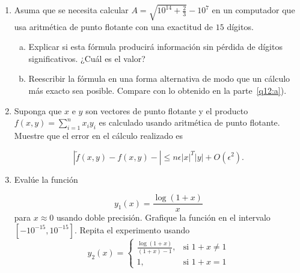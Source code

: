 \begin{frame}
  \begin{enumerate}
    \resume

    \item

          Asuma que se necesita calcular
          \begin{math}
            A=
            \sqrt{
              10^{14}+\frac{2}{3}
            }-
            10^7
          \end{math}
          en un computador que usa aritmética de punto flotante con una
          exactitud de $15$ dígitos.

          \begin{enumerate}[a)]
            \item Explicar si esta fórmula producirá información sin
                  pérdida de dígitos significativos.
                  ¿Cuál es el valor?

            \item\label{q12:a}

                  Reescribir la fórmula en una forma alternativa de
                  modo que un cálculo más exacto sea posible.
                  Compare con lo obtenido en la parte~\ref{q12:a}).
          \end{enumerate}

    \item

          Suponga que $x$ e $y$ son vectores de punto flotante y el
          producto $f\left(x,y\right)=\sum_{i=1}^{n}x_{i}y_{i}$
          es calculado usando aritmética de punto flotante.
          Muestre que el error en el cálculo realizado es

          \begin{equation*}
            \left|
            \widetilde{f}\left(x,y\right)-
            f\left(x,y\right)-
            \right|\leq
            n\epsilon
            {\left|x\right|}^{T}
            \left|y\right|+
            O\left(\epsilon^2\right).
          \end{equation*}


    \item

          Evalúe la función

          \begin{equation*}
            y_{1}\left(x\right)=
            \frac{\log\left(1+x\right)}{x}
          \end{equation*}
          para $x\approx 0$ usando doble precisión.
          Grafique la función en el intervalo
          $\left[-10^{-15},10^{-15}\right]$.
          Repita el experimento usando
          \begin{equation*}
            y_{2}\left(x\right)=
            \begin{cases}
              \frac{\log\left(1+x\right)}{\left(1+x\right)-1},
               & \text{si }1+x\neq 1 \\
              1,
               & \text{si } 1+x=1
            \end{cases}
          \end{equation*}


\end{enumerate}
\end{frame}

